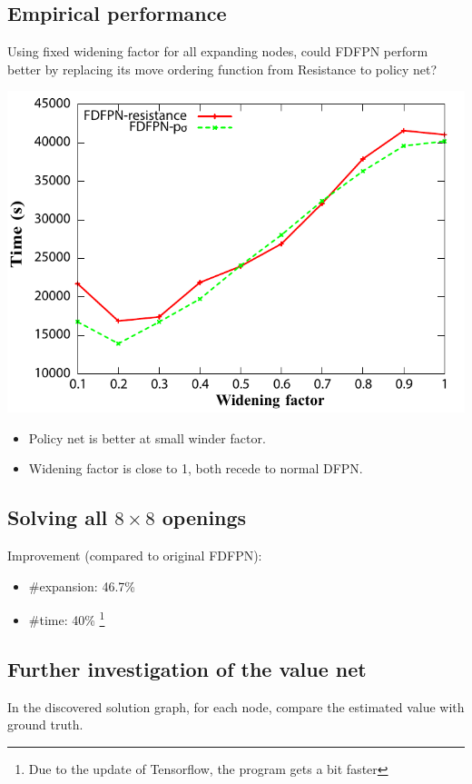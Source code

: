 \documentclass[a0,portrait]{a0poster}
\begin{document}
\begin{multicols}{3}
\subsection*{Empirical performance}
Using fixed widening factor for all expanding nodes, could FDFPN perform better by replacing its move
ordering function from Resistance to policy net?
\begin{center}\vspace{1cm}
\includegraphics[width=0.8\linewidth]{mycompare.pdf}
\end{center}\vspace{1cm}
\begin{itemize}
\item Policy net is better at small winder factor.
\item Widening factor is close to 1, both recede to normal DFPN.
\end{itemize}

\subsection*{Solving all $8\times 8$ openings}

Improvement (compared to original FDFPN):
\begin{itemize}
\item \#expansion: 46.7\%
\item \#time: 40\% \footnote{Due to the update of Tensorflow, the program gets a bit faster}
\end{itemize}

\subsection*{Further investigation of the value net}
In the discovered solution graph, for each node,
compare the estimated value with ground truth.


\end{multicols}
\end{document}

